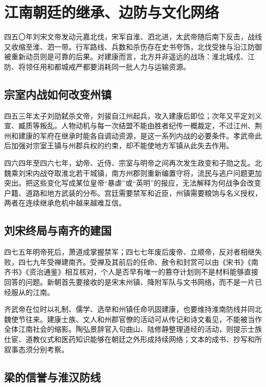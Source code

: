 \section{江南朝廷的继承、边防与文化网络}
\label{sec:southern-courts-liu-song-qi-liang}

四五〇年刘宋文帝发动元嘉北伐，宋军自淮、泗北进，太武帝随后南下反击，战线又收缩至淮、泗一带。行军路线、兵数和杀伤存在史书夸饰，北伐受挫与沿江防御被重新动员则是可靠的后果。对建康而言，北方并非遥远的战场：淮北城戍、江防、将领任用和都城戒严都要消耗同一批人力与运输资源。

\subsection{宗室内战如何改变州镇}

四五三年太子刘劭弑杀文帝，刘骏自江州起兵，攻入建康后即位；次年又平定刘义宣、臧质等叛乱。人物动机与每一次结盟不能由胜者纪传一概裁定，不过江州、荆州和建康的军府在继承时能各自调动资源，是这一系列内战的必要条件。孝武帝此后加强对宗室王镇与州郡兵权的约束，却不能使地方军镇从此失去作用。

四六四年至四六七年，幼帝、近侍、宗室与明帝之间再次发生政变和子勋之乱。北魏乘刘宋内战夺取淮北若干城镇，南方州郡则重新编置守将，流民与逃户问题更加突出。把这些变化写成某位皇帝“暴虐”或“英明”的报应，无法解释为何战争会改变户籍、道路和地方武装的分布。宫廷需要禁军和近臣，州镇需要粮饷与名义授权，两者在连续继承危机中越来越难互信。

\subsection{刘宋终局与南齐的建国}

四七五年明帝死后，萧道成掌握禁军；四七七年废后废帝、立顺帝，反对者相继失败，四七九年受禅建南齐。受禅及其前后的任命、赦令和封赏可以由《宋书》《南齐书》《资治通鉴》相互核对，个人是否早有唯一的篡夺计划则不是材料能够直接回答的问题。新朝首先要接收的是宋末州镇、降附军队与文书网络，而不是一片已经服从的江南。

齐武帝在位时以礼制、儒学、选举和州镇任命巩固建康，也要维持淮南防线并同北魏使节往来。建康士族、文人和州郡官僚的活动可从传记和诗文看见，不能被当作全体江南社会的缩影。陶弘景辞官入句曲山、陆修静整理道经的活动，则提示士族仕宦、道教仪式和医药知识能够在朝廷之外形成持续网络；文本的成书、抄写和所叙事态须分别考察。

\subsection{梁的信誉与淮汉防线}

